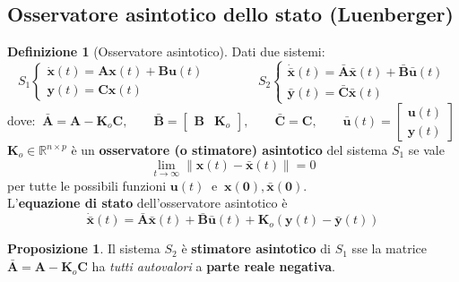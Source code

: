 \documentclass[a4paper]{article}
\newcommand{\numberset}{\mathbb}
\newcommand{\R}{\numberset{R}}
\renewcommand{\vec}{\bm}
\theoremstyle{definition}
\newtheorem{defn}{Definizione}[subsection]
\newtheorem{prop}{Proposizione}[subsection]
\begin{document}
	\subsection{Osservatore asintotico dello stato (Luenberger)}
		\begin{defn}[Osservatore asintotico]
		Dati due sistemi:
			\[
				S_1
				\begin{cases}
					\dot{\vec{x}}(t) = \vec{A}\vec{x}(t) + \vec{B}\vec{u}(t) \\
					\vec{y}(t) = \vec{C}\vec{x}(t)
				\end{cases}
				\qquad\qquad
				S_2
				\begin{cases}
					\dot{\bar{\vec{x}}}(t) = \bar{\vec{A}}\bar{\vec{x}}(t) + \bar{\vec{B}}\bar{\vec{u}}(t) \\
					\bar{\vec{y}}(t) = \bar{\vec{C}}\bar{\vec{x}}(t)
				\end{cases}
			\]
			dove: $ \ \bar{\vec{A}} = \vec{A} - \vec{K}_o \vec{C}, \qquad \bar{\vec{B}} = \begin{bmatrix}
			\vec{B} & \vec{K}_o
			\end{bmatrix}, \qquad \bar{\vec{C}} = \vec{C}, \qquad \bar{\vec{u}}(t) = \begin{bmatrix}
			\vec{u}(t) \\ \vec{y}(t)
			\end{bmatrix}  $\\
			$ \vec{K}_o \in \R^{n\times p} $ è un \textbf{osservatore (o stimatore) asintotico} del sistema $ S_1 $ se vale
			\[
				\lim_{t\rightarrow \infty} \| \vec{x}(t) - \bar{\vec{x}}(t) \| = 0
			\]
			per tutte le possibili funzioni $ \vec{u}(t)\ $ e $\ \vec{x}(\vec{0}), \bar{\vec{x}}(\vec{0}) $.\\
			L'\textbf{equazione di stato} dell'osservatore asintotico è
			\[
				\dot{\bar{\vec{x}}}(t) = \bar{\vec{A}}\bar{\vec{x}}(t) + \bar{\vec{B}}\bar{\vec{u}}(t) + 
				\vec{K}_o(\vec{y}(t) - \bar{\vec{y}}(t))
			\]
		\end{defn}
		
		\begin{prop}
			Il sistema $ S_2 $ è \textbf{stimatore asintotico} di $ S_1 $ sse la matrice $ \bar{\vec{A}} = \vec{A} - \vec{K}_o\vec{C} $ ha \textit{tutti autovalori} a \textbf{parte reale negativa}.
		\end{prop}
	
		
\end{document}
